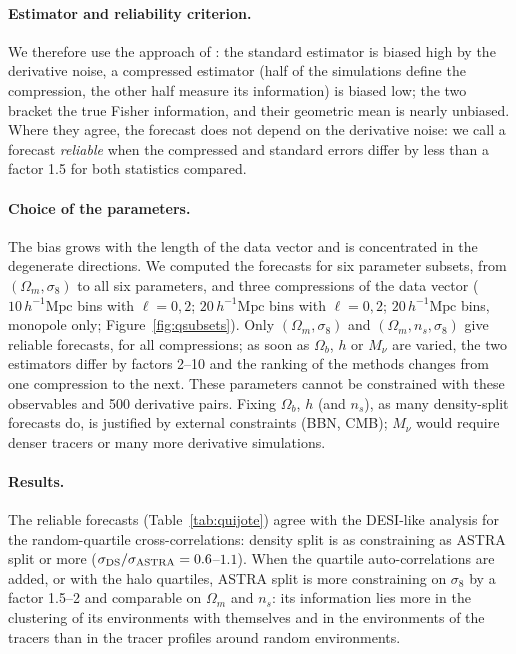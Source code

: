 \documentclass[11pt,twocolumn]{article}
\newcommand{\Mpch}{\,h^{-1}\mathrm{Mpc}}
\begin{document}
\paragraph{Estimator and reliability criterion.} We therefore use the approach of \cite{CoultonWandelt2023}: the standard estimator is biased high by the derivative noise, a compressed estimator (half of the simulations define the compression, the other half measure its information) is biased low; the two bracket the true Fisher information, and their geometric mean is nearly unbiased. Where they agree, the forecast does not depend on the derivative noise: we call a forecast \emph{reliable} when the compressed and standard errors differ by less than a factor 1.5 for both statistics compared.

\paragraph{Choice of the parameters.} The bias grows with the length of the data vector and is concentrated in the degenerate directions. We computed the forecasts for six parameter subsets, from $(\Omega_m,\sigma_8)$ to all six parameters, and three compressions of the data vector ($10\Mpch$ bins with $\ell=0,2$; $20\Mpch$ bins with $\ell=0,2$; $20\Mpch$ bins, monopole only; Figure~\ref{fig:qsubsets}). Only $(\Omega_m,\sigma_8)$ and $(\Omega_m,n_s,\sigma_8)$ give reliable forecasts, for all compressions; as soon as $\Omega_b$, $h$ or $M_\nu$ are varied, the two estimators differ by factors 2--10 and the ranking of the methods changes from one compression to the next. These parameters cannot be constrained with these observables and 500 derivative pairs. Fixing $\Omega_b$, $h$ (and $n_s$), as many density-split forecasts do, is justified by external constraints (BBN, CMB); $M_\nu$ would require denser tracers or many more derivative simulations.

\paragraph{Results.} The reliable forecasts (Table~\ref{tab:quijote}) agree with the DESI-like analysis for the random-quartile cross-correlations: density split is as constraining as ASTRA split or more ($\sigma_{\rm DS}/\sigma_{\rm ASTRA}=0.6$--$1.1$). When the quartile auto-correlations are added, or with the halo quartiles, ASTRA split is more constraining on $\sigma_8$ by a factor 1.5--2 and comparable on $\Omega_m$ and $n_s$: its information lies more in the clustering of its environments with themselves and in the environments of the tracers than in the tracer profiles around random environments.
\end{document}
